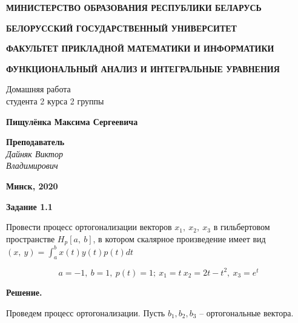 \documentclass[12pt, a4paper]{article}
\begin{document}
\begin{titlepage}


  
  \centerline{\large \bf МИНИСТЕРСТВО ОБРАЗОВАНИЯ РЕСПУБЛИКИ БЕЛАРУСЬ}
  \bigskip
  \bigskip
  \centerline{\large \bf БЕЛОРУССКИЙ ГОСУДАРСТВЕННЫЙ УНИВЕРСИТЕТ}
  \bigskip
  \bigskip
  \centerline{\large \bf ФАКУЛЬТЕТ ПРИКЛАДНОЙ МАТЕМАТИКИ И ИНФОРМАТИКИ}
  \vfill
  \vfill
  \vfill
  \centerline{\large \bf ФУНКЦИОНАЛЬНЫЙ АНАЛИЗ И ИНТЕГРАЛЬНЫЕ УРАВНЕНИЯ}
  \bigskip
  \bigskip
  \vfill
  \begin{centering}
    {\large
    Домашняя работа\\
    студента 2 курса 2 группы \\}
  \end{centering}
  \centerline{\large \bf Пищулёнка Максима Сергеевича}
  \vfill
  \vfill
  \hfill
  \begin{minipage}{0.25\textwidth}
    {\large{\bf Преподаватель} \\
  {\it Дайняк Виктор \\ Владимирович}}
  \end{minipage}
  \vfill
  \vfill
  \centerline{\Large \bf Минск, 2020}
  
  \end{titlepage}

\begin{center}
\end{center}


\textbf{Задание 1.1}

Провести процесс ортогонализации векторов $x_1,\ x_2,\ x_3$ в гильбертовом 
пространстве $H_p[a,\ b]$, в котором скалярное произведение имеет вид 
$(x,\ y) = \int_a^b x(t)y(t)p(t) dt$

\[a = -1,\ b = 1,\ p(t)=1;\ x_1=t\ x_2=2t-t^2,\ x_3=e^t\]

\textbf{Решение.} 

Проведем процесс ортогонализации. Пусть {$b_1, b_2, b_3$} --
ортогональные вектора. 
\end{document}
